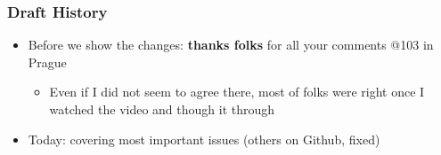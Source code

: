 \documentclass[11pt,show 
notes,notheorems,noamsthm,blank]{beamer} %
\begin{document}
\begin{frame}
\frametitle{Draft History}


\begin{itemize}

% 
%     
% 
% 


\item Before we show the changes: \textbf{thanks folks }for all your comments @103 in Prague

\begin{itemize}
  \item Even if I did not seem to agree there, most of folks were right once I watched the video and though it through
  \end{itemize}

\item Today: covering most important  issues (others on Github, fixed)

\end{itemize}
\end{frame}
\end{document}
